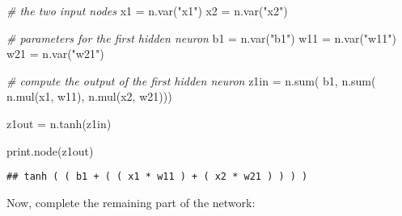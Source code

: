 \documentclass[
  a4paper,
]{article}
\newenvironment{Shaded}{\begin{snugshade}}{\end{snugshade}}
\newcommand{\CommentTok}[1]{\textcolor[rgb]{0.56,0.35,0.01}{\textit{#1}}}
\newcommand{\FunctionTok}[1]{\textcolor[rgb]{0.00,0.00,0.00}{#1}}
\newcommand{\NormalTok}[1]{#1}
\newcommand{\OtherTok}[1]{\textcolor[rgb]{0.56,0.35,0.01}{#1}}
\newcommand{\StringTok}[1]{\textcolor[rgb]{0.31,0.60,0.02}{#1}}
\begin{document}
\begin{Shaded}
\begin{Highlighting}[]
\CommentTok{\# the two input nodes}
\NormalTok{x1 }\OtherTok{=} \FunctionTok{n.var}\NormalTok{(}\StringTok{"x1"}\NormalTok{)}
\NormalTok{x2 }\OtherTok{=} \FunctionTok{n.var}\NormalTok{(}\StringTok{"x2"}\NormalTok{)}

\CommentTok{\# parameters for the first hidden neuron}
\NormalTok{b1 }\OtherTok{=} \FunctionTok{n.var}\NormalTok{(}\StringTok{"b1"}\NormalTok{)}
\NormalTok{w11 }\OtherTok{=} \FunctionTok{n.var}\NormalTok{(}\StringTok{"w11"}\NormalTok{)}
\NormalTok{w21 }\OtherTok{=} \FunctionTok{n.var}\NormalTok{(}\StringTok{"w21"}\NormalTok{)}

\CommentTok{\# compute the output of the first hidden neuron}
\NormalTok{z1in }\OtherTok{=} \FunctionTok{n.sum}\NormalTok{(}
\NormalTok{    b1,}
    \FunctionTok{n.sum}\NormalTok{(}
       \FunctionTok{n.mul}\NormalTok{(x1, w11),}
       \FunctionTok{n.mul}\NormalTok{(x2, w21)))}

\NormalTok{z1out }\OtherTok{=} \FunctionTok{n.tanh}\NormalTok{(z1in)}

\FunctionTok{print.node}\NormalTok{(z1out)}
\end{Highlighting}
\end{Shaded}

\begin{verbatim}
## tanh ( ( b1 + ( ( x1 * w11 ) + ( x2 * w21 ) ) ) )
\end{verbatim}

Now, complete the remaining part of the network:
\end{document}
